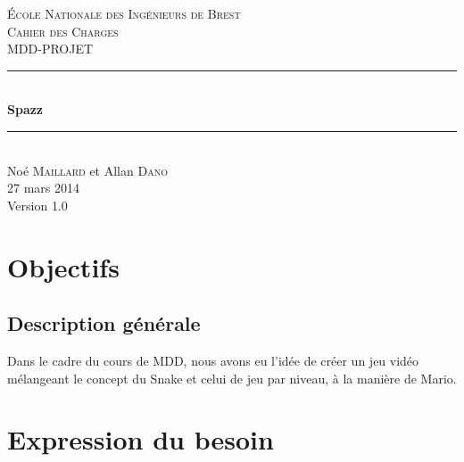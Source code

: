 \documentclass[a4paper,11pt]{article}
\begin{document}
\begin{titlepage}

\newcommand{\HRule}{\rule{\linewidth}{0.5mm}} %

\center %
 

\textsc{\LARGE École Nationale des Ingénieurs de Brest}\\[1.5cm]
\textsc{\Large Cahier des Charges}\\[0.5cm]
\textsc{\large MDD-PROJET}\\[0.5cm]


\HRule \\[0.4cm]
{\huge \bfseries Spazz}\\[0.4cm] %
\HRule \\[1.5cm]
 
\Large
Noé \textsc{Maillard} et Allan \textsc{Dano}\\[3cm]


{\large 27 mars 2014}\\[3cm]

{\large Version 1.0}
 

\vfill

\end{titlepage}
\newpage
\tableofcontents
\newpage
\section{Objectifs}

\subsection{Description générale}


Dans le cadre du cours de MDD, nous avons eu l'idée de créer un jeu vidéo mélangeant le concept du Snake et celui de jeu par niveau, à la manière de Mario.

\section{Expression du besoin}
\end{document}

